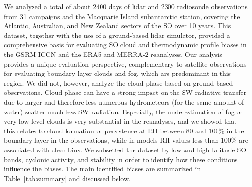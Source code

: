 \documentclass[draft]{agujournal2019}
\begin{document}
We analyzed a total of about 2400 days of lidar and 2300 radiosonde observations from 31 campaigns and the Macquarie Island subantarctic station, covering the Atlantic, Australian, and New Zealand sectors of the SO over 10 years. This dataset, together with the use of a ground-based lidar simulator, provided a comprehensive basis for evaluating SO cloud and thermodynamic profile biases in the GSRM ICON and the ERA5 and MERRA-2 reanalyses. Our analysis provides a unique evaluation perspective, complementary to satellite observations for evaluating boundary layer clouds and fog, which are predominant in this region. We did not, however, analyze the cloud phase based on ground-based observations. Cloud phase can have a strong impact on the SW radiative transfer due to larger and therefore less numerous hydrometeors (for the same amount of water) scatter much less SW radiation. Especially, the underestimation of fog or very low-level clouds is very substantial in the reanalyses, and we showed that this relates to cloud formation or persistence at RH between 80 and 100\% in the boundary layer in the observations, while in models RH values less than 100\% are associated with clear bins. We subsetted the dataset by low and high latitude SO bands, cyclonic activity, and stability in order to identify how these conditions influence the biases. The main identified biases are summarized in Table~\ref{tab:summary} and discussed below.
\end{document}
